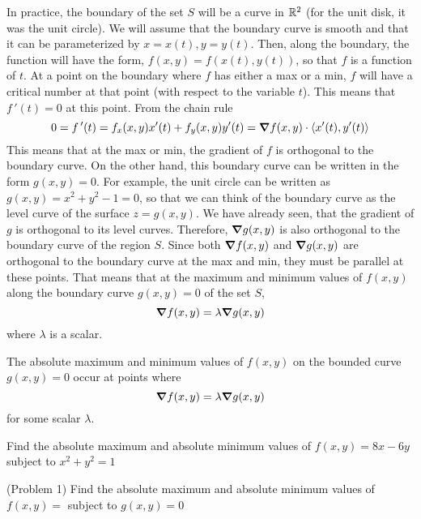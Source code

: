 \documentclass[handout]{ximera}
\begin{document}
In practice, the boundary of the set $S$ will be a curve in $\mathbb R^2$ (for the unit disk, it was the unit circle).
We will assume that the boundary curve is smooth and that it can be parameterized by $x = x(t), y = y(t)$.
Then, along the boundary, the function will have the form, $f(x, y) = f(x(t), y(t))$, so that $f$ is a function of $t$.
At a point on the boundary where $f$ has either a max or a min, $f$ will have a critical number at that point (with respect to the variable $t$).
This means that $f\,'(t) = 0$ at this point. From the chain rule
\[
0 = f\,'(t) = f_x(x, y) x'(t) + f_y(x,y) y'(t) = \boldsymbol\nabla f(x,y) \cdot \left\langle x'(t), y'(t)\right\rangle
\]
This means that at the max or min, the gradient of $f$ is orthogonal to the boundary curve.
On the other hand, this boundary curve can be written in the form $g(x,y) = 0$. For example, the unit circle can be written as $g(x,y) = x^2 + y^2 - 1 = 0$,
so that we can think of the boundary curve as the level curve of the surface $z = g(x,y)$. We have already seen, that the gradient of $g$ is orthogonal
to its level curves.  Therefore, $\boldsymbol\nabla g(x,y)$ is also orthogonal to the boundary curve of the region $S$.
Since both $\boldsymbol\nabla f(x,y)$ and $\boldsymbol\nabla g(x,y)$ are orthogonal to the boundary curve at the max and min, they must be parallel at these points.
That means that at the maximum and minimum values of $f(x,y)$ along the boundary curve $g(x,y) = 0$ of the set $S$, 
\[
\boldsymbol\nabla f(x,y) = \lambda \boldsymbol\nabla g(x,y)
\]
where $\lambda$ is a scalar.

\begin{theorem}
The absolute maximum and minimum values of $f(x,y)$ on the bounded curve $g(x,y) = 0$ occur at 
points where 
\[
\boldsymbol\nabla f(x,y) = \lambda \boldsymbol\nabla g(x,y)
\]
for some scalar $\lambda$.
\end{theorem}

\begin{example}[Example 1]
Find the absolute maximum and absolute minimum values of $f(x,y) = 8x - 6y$ subject to $x^2 + y^2 = 1$\\
\end{example}

\begin{problem}(Problem 1)
Find the absolute maximum and absolute minimum values of $f(x,y) = $ subject to $g(x,y) = 0$\\
\end{problem}
\end{document}
